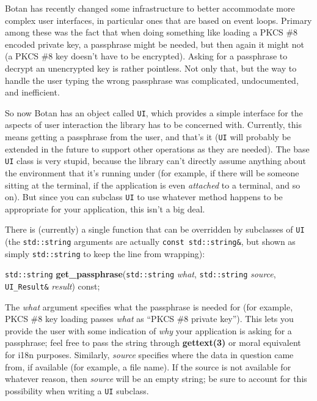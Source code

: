 \documentclass{article}
\newcommand{\function}[1]{\textbf{#1}}
\newcommand{\type}[1]{\texttt{#1}}
\renewcommand{\arg}[1]{\textsl{#1}}
\begin{document}
Botan has recently changed some infrastructure to better accommodate more
complex user interfaces, in particular ones that are based on event
loops. Primary among these was the fact that when doing something like loading
a PKCS \#8 encoded private key, a passphrase might be needed, but then again it
might not (a PKCS \#8 key doesn't have to be encrypted). Asking for a
passphrase to decrypt an unencrypted key is rather pointless. Not only that,
but the way to handle the user typing the wrong passphrase was complicated,
undocumented, and inefficient.

So now Botan has an object called \type{UI}, which provides a simple interface
for the aspects of user interaction the library has to be concerned
with. Currently, this means getting a passphrase from the user, and that's it
(\type{UI} will probably be extended in the future to support other operations
as they are needed). The base \type{UI} class is very stupid, because the
library can't directly assume anything about the environment that it's running
under (for example, if there will be someone sitting at the terminal, if the
application is even \emph{attached} to a terminal, and so on). But since you
can subclass \type{UI} to use whatever method happens to be appropriate for
your application, this isn't a big deal.

There is (currently) a single function that can be overridden by subclasses of
\type{UI} (the \type{std::string} arguments are actually \type{const
std::string\&}, but shown as simply \type{std::string} to keep the line from
wrapping):

\noindent
\type{std::string} \function{get\_passphrase}(\type{std::string} \arg{what},
                                              \type{std::string} \arg{source},
                                     \type{UI\_Result\&} \arg{result}) const;

The \arg{what} argument specifies what the passphrase is needed for (for
example, PKCS \#8 key loading passes \arg{what} as ``PKCS \#8 private
key''). This lets you provide the user with some indication of \emph{why} your
application is asking for a passphrase; feel free to pass the string through
\function{gettext(3)} or moral equivalent for i18n purposes. Similarly,
\arg{source} specifies where the data in question came from, if available (for
example, a file name). If the source is not available for whatever reason, then
\arg{source} will be an empty string; be sure to account for this possibility
when writing a \type{UI} subclass.
\end{document}
